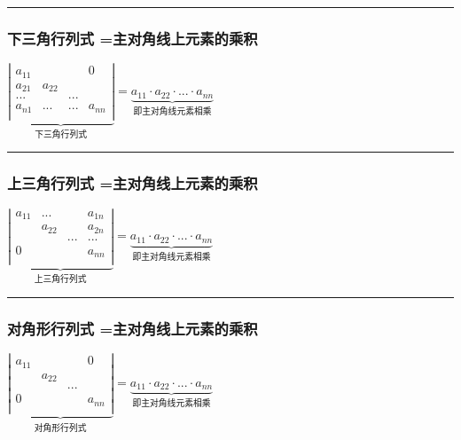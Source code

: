 \documentclass[UTF8]{ctexart}
\begin{document}
\hrule

	
\subsubsection{下三角行列式 =主对角线上元素的乘积}

$
\underset{\text{下三角行列式}}{\underbrace{\left| \begin{matrix}
			a_{11}&		&		&	0	\\
			a_{21}&		a_{22}&		&		\\
			...&		&		...&		\\
			a_{n1}&		...&		...&		a_{nn}\\
		\end{matrix} \right|}}=\underset{\text{即主对角线元素相乘}}{\underbrace{a_{11}\cdot a_{22}\cdot ...\cdot a_{nn}}}
$


\hrule


\subsubsection{上三角行列式 =主对角线上元素的乘积}

$
\underset{\text{上三角行列式}}{\underbrace{\left| \begin{matrix}
			a_{11}&		...&		&		a_{1n}\\
			&		a_{22}&		&		a_{2n}\\
			&		&		...&		...\\
			0&		&		&		a_{nn}\\
		\end{matrix} \right|}}=\underset{\text{即主对角线元素相乘}}{\underbrace{a_{11}\cdot a_{22}\cdot ...\cdot a_{nn}}}
$\\



\hrule


\subsubsection{对角形行列式 =主对角线上元素的乘积}
$
\underset{\text{对角形行列式}}{\underbrace{\left| \begin{matrix}
			a_{11}&		&		&		0\\
			&		a_{22}&		&		\\
			&		&		...&		\\
			0&		&		&		a_{nn}\\
		\end{matrix} \right|}}=\underset{\text{即主对角线元素相乘}}{\underbrace{a_{11}\cdot a_{22}\cdot ...\cdot a_{nn}}}
$\\
\end{document}
